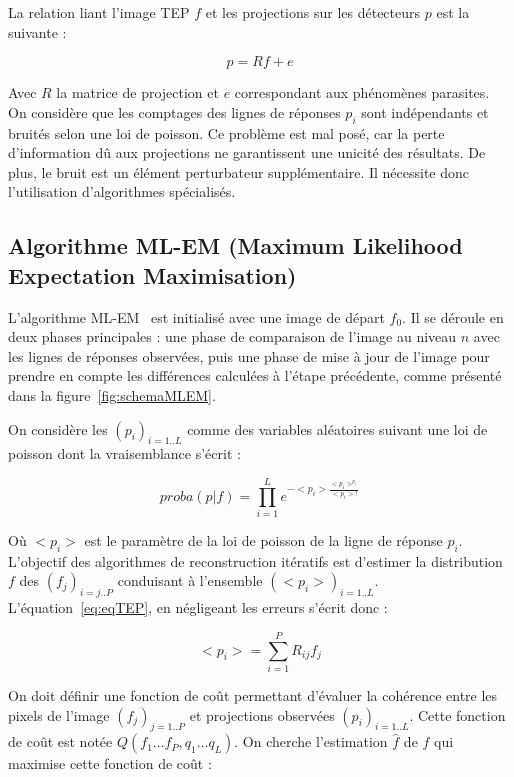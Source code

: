 La relation liant l'image TEP $f$ et les projections sur les détecteurs $p$ est la suivante :

\begin{equation}
	p = R f + e
\label{eq:eqTEP}
\end{equation}

Avec $R$ la matrice de projection et $e$ correspondant aux phénomènes parasites. On considère que les comptages des lignes de réponses $p_i$ sont indépendants et bruités selon une loi de poisson. Ce problème est mal posé, car la perte d'information dû aux projections ne garantissent une unicité des résultats. De plus, le bruit est un élément perturbateur supplémentaire. Il nécessite donc l'utilisation d'algorithmes spécialisés. 


		\subsection{Algorithme ML-EM (Maximum Likelihood Expectation Maximisation) }



L'algorithme ML-EM~\cite{shepp1982maximum} est initialisé avec une image de départ $f_0$. Il se déroule en deux phases principales : une phase de comparaison de l'image au niveau $n$ avec les lignes de réponses observées, puis une phase de mise à jour de l'image pour prendre en compte les différences calculées à l'étape précédente, comme présenté dans la figure~\ref{fig:schemaMLEM}.

On considère les $(p_i)_{i=1..L}$ comme des variables aléatoires suivant une loi de poisson dont la vraisemblance s'écrit :

\begin{equation}
proba(p|f) = \prod\limits_{i=1}^{L}e^{-<p_i> \frac{<p_i>^{p_i}}{<p_i> !}}
\end{equation}

Où $<p_i>$ est le paramètre de la loi de poisson de la ligne de réponse $p_i$. L'objectif des algorithmes de reconstruction itératifs est d'estimer la distribution $f$ des $(f_j)_{i=j..P}$ conduisant à l'ensemble $(<p_i>)_{i=1..L}$. L'équation~\ref{eq:eqTEP}, en négligeant les erreurs s'écrit donc :

\[
<p_i> = \sum\limits_{i=1}^{P} R_{ij}f_j
\]

On doit définir une fonction de coût permettant d'évaluer la cohérence entre les pixels de l'image $(f_j)_{j=1..P}$ et projections observées $(p_i)_{i=1..L}$. Cette fonction de coût est notée $Q(f_1 \dots f_P, q_1 \dots q_L)$. On cherche l'estimation $\hat{f}$ de $f$ qui maximise cette fonction de coût :

